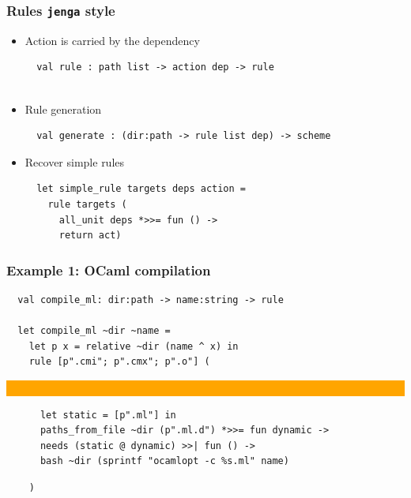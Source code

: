 \documentclass{beamer}
\begin{document}

\begin{frame}[fragile]
\frametitle{Rules {\tt jenga} style}
\begin{itemize}
\item Action is carried by the dependency
{\footnotesize
\begin{verbatim}
  val rule : path list -> action dep -> rule
  
\end{verbatim}}
\item Rule generation
{\footnotesize
\begin{verbatim}
  val generate : (dir:path -> rule list dep) -> scheme

\end{verbatim}}
\item Recover simple rules
{\footnotesize
\begin{verbatim}
  let simple_rule targets deps action =
    rule targets (
      all_unit deps *>>= fun () ->
      return act)
\end{verbatim}}
\end{itemize}
\end{frame}



\begin{frame}[fragile]
\frametitle{Example 1: OCaml compilation}
{\footnotesize
\begin{verbatim}
  val compile_ml: dir:path -> name:string -> rule
  
  let compile_ml ~dir ~name =
    let p x = relative ~dir (name ^ x) in
    rule [p".cmi"; p".cmx"; p".o"] (
\end{verbatim}
\vskip-16pt\hskip18pt
\colorbox{orange}{\parbox[t][2.3cm][t]{8.7cm}{\ }}\vspace*{-2.5cm}
\begin{verbatim}
      let static = [p".ml"] in
      paths_from_file ~dir (p".ml.d") *>>= fun dynamic ->
      needs (static @ dynamic) >>| fun () ->
      bash ~dir (sprintf "ocamlopt -c %s.ml" name)
\end{verbatim}
\begin{verbatim}
    )


\end{verbatim}}
\end{frame}
\end{document}
